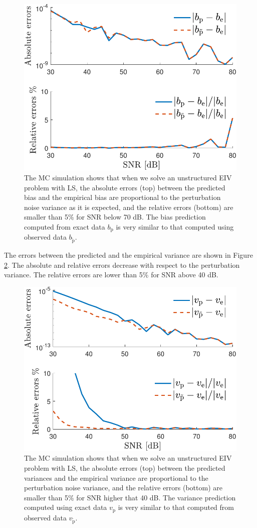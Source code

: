 \begin{figure}[htb!]
  \centering
  \includegraphics[width=0.69\columnwidth]{./ChapterStatisticalAnalysis/fig/Fig_3.pdf} 
  \caption{ \label{fig:b_bt_abse_rele_unstr_e7} The MC simulation shows that when we solve an unstructured EIV problem with LS, the absolute errors (top) between the predicted bias and the empirical bias are proportional to the perturbation noise variance as it is expected, and the relative errors (bottom) are smaller than 5\% for SNR below 70 dB. The bias prediction computed from exact data ${b}_\mathrm{p}$ is very similar to that computed using observed data $b_{\widetilde{\mathrm{p}}}$. } 
\end{figure}

The errors between the predicted and the empirical variance are shown in Figure \ref{fig:v_vt_abse_rele_unstr_e7}.
The absolute and relative errors decrease with respect to the perturbation variance.
The relative errors are lower than 5\% for SNR above 40 dB. 

\begin{figure}[htb!]
  \centering
  \includegraphics[width=0.69\columnwidth]{./ChapterStatisticalAnalysis/fig/Fig_4.pdf} 
  \caption{ \label{fig:v_vt_abse_rele_unstr_e7} The MC simulation shows that when we solve an unstructured EIV problem with LS, the absolute errors (top) between the predicted variances and the empirical variance are proportional to the perturbation noise variance, and the relative errors (bottom) are smaller than 5\% for SNR higher that 40 dB. The variance prediction computed using exact data ${v}_\mathrm{p}$ is very similar to that computed from observed data $v_{\widetilde{\mathrm{p}}}$. } 
\end{figure}

